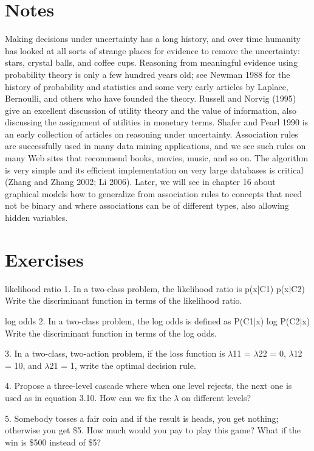 \section{Notes}

Making decisions under uncertainty has a long history, and over time humanity has looked at all sorts of strange places for evidence to remove the uncertainty: stars, crystal balls, and coffee cups. Reasoning from meaningful evidence using probability theory is only a few hundred years old; see Newman 1988 for the history of probability and statistics and some very early articles by Laplace, Bernoulli, and others who have founded the theory. Russell and Norvig (1995) give an excellent discussion of utility theory and the value of information, also discussing the assignment of utilities in monetary terms. Shafer and Pearl 1990 is an early collection of articles on reasoning under uncertainty. Association rules are successfully used in many data mining applications, and we see such rules on many Web sites that recommend books, movies, music, and so on. The algorithm is very simple and its efficient implementation on very large databases is critical (Zhang and Zhang 2002; Li 2006). Later, we will see in chapter 16 about graphical models how to generalize from association rules to concepts that need not be binary and where associations can be of different types, also allowing hidden variables.

\section{Exercises}

likelihood ratio 1. In a two-class problem, the likelihood ratio is p(x|C1) p(x|C2) Write the discriminant function in terms of the likelihood ratio.

log odds 2. In a two-class problem, the log odds is defined as P(C1|x) log P(C2|x) Write the discriminant function in terms of the log odds.

3. In a two-class, two-action problem, if the loss function is $\lambda$11 = $\lambda$22 = 0, $\lambda$12 = 10, and $\lambda$21 = 1, write the optimal decision rule.

4. Propose a three-level cascade where when one level rejects, the next one is used as in equation 3.10. How can we fix the $\lambda$ on different levels?

5. Somebody tosses a fair coin and if the result is heads, you get nothing; otherwise you get \$5. How much would you pay to play this game? What if the win is \$500 instead of \$5?

